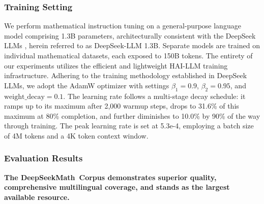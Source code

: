\subsubsection{Training Setting}
\label{sec:quality-policy}
We perform mathematical instruction tuning on a general-purpose language model comprising 1.3B parameters, architecturally consistent with the DeepSeek LLMs \citep{deepseek-llm}, herein referred to as DeepSeek-LLM 1.3B. Separate models are trained on individual mathematical datasets, each exposed to 150B tokens. The entirety of our experiments utilizes the efficient and lightweight HAI-LLM \citep{haillm} training infrastructure. Adhering to the training methodology established in DeepSeek LLMs, we adopt the AdamW optimizer \citep{adamW} with settings $\beta_1=0.9$, $\beta_2=0.95$, and $\mathrm{weight\_decay}=0.1$. The learning rate follows a multi-stage decay schedule: it ramps up to its maximum after 2,000 warmup steps, drops to 31.6\% of this maximum at 80\% completion, and further diminishes to 10.0\% by 90\% of the way through training. The peak learning rate is set at 5.3e-4, employing a batch size of 4M tokens and a 4K token context window.

\subsubsection{Evaluation Results}

\textbf{The DeepSeekMath~Corpus demonstrates superior quality, comprehensive multilingual coverage, and stands as the largest available resource.}

